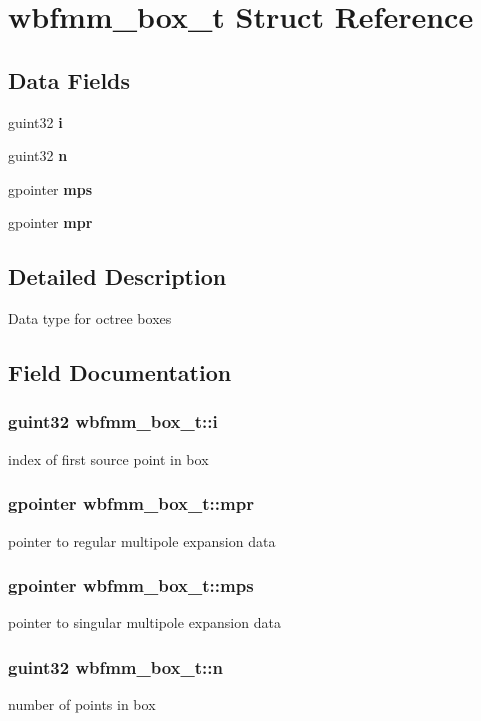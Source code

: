 \section{wbfmm\+\_\+box\+\_\+t Struct Reference}
\label{structwbfmm__box__t}
\subsection*{Data Fields}
\begin{DoxyCompactItemize}
\item 
guint32 {\bf i}
\item 
guint32 {\bf n}
\item 
gpointer {\bf mps}
\item 
gpointer {\bf mpr}
\end{DoxyCompactItemize}


\subsection{Detailed Description}
Data type for octree boxes 

\subsection{Field Documentation}
\subsubsection[{i}]{\setlength{\rightskip}{0pt plus 5cm}guint32 wbfmm\+\_\+box\+\_\+t\+::i}\label{structwbfmm__box__t_a5f24b619335d6e99896542180f60925a}
index of first source point in box 
\subsubsection[{mpr}]{\setlength{\rightskip}{0pt plus 5cm}gpointer wbfmm\+\_\+box\+\_\+t\+::mpr}\label{structwbfmm__box__t_a3dad2b2788aad8a07c85ef1d09bb70be}
pointer to regular multipole expansion data 
\subsubsection[{mps}]{\setlength{\rightskip}{0pt plus 5cm}gpointer wbfmm\+\_\+box\+\_\+t\+::mps}\label{structwbfmm__box__t_a4f82965274a1740568a2ddfef3190db9}
pointer to singular multipole expansion data 
\subsubsection[{n}]{\setlength{\rightskip}{0pt plus 5cm}guint32 wbfmm\+\_\+box\+\_\+t\+::n}\label{structwbfmm__box__t_a2b1e7872b6ada459d4f09465c3af8eca}
number of points in box 